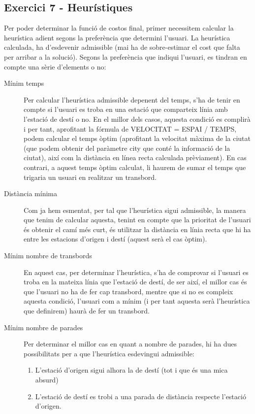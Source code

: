 \documentclass[a4paper,12pt]{article}
\begin{document}
        \subsection*{Exercici 7 - Heurístiques}

            Per poder determinar la funció de costos final, primer necessitem calcular la heurística adient segons la preferència que determini l’usuari.
            La heurística calculada, ha d’esdevenir admissible (mai ha de sobre-estimar el cost que falta per arribar a la solució).
            Segons la preferència que indiqui l’usuari, es tindran en compte una sèrie d’elements o no:
            \begin{description}
                \item[Mínim temps] Per calcular l’heurística admissible depenent del temps, s’ha de tenir en compte si l’usuari es troba en una estació que comparteix línia amb l’estació de destí o no. En el millor dels casos, aquesta condició es complirà i per tant, aprofitant la fórmula de VELOCITAT = ESPAI / TEMPS, podem calcular el temps òptim (aprofitant la velocitat màxima de la ciutat (que podem obtenir del paràmetre city que conté la informació de la ciutat), així com la distància en línea recta calculada prèviament).
                En cas contrari, a aquest temps òptim calculat, li haurem de sumar el temps que trigaria un usuari en realitzar un transbord.
                \item[Distància mínima] Com ja hem esmentat, per tal que l’heurística sigui admissible, la manera que tenim de calcular aquesta, tenint en compte que la prioritat de l’usuari és obtenir el camí més curt, és utilitzar la distància en línia recta que hi ha entre les estacions d’origen i destí (aquest serà el cas òptim).
                \item[Mínim nombre de transbords] En aquest cas, per determinar l’heurística, s’ha de comprovar si l’usuari es troba en la mateixa línia que l’estació de destí, de ser així, el millor cas és que l’usuari no ha de fer cap transbord, mentre que si no es compleix aquesta condició, l’usuari com a mínim (i per tant aquesta serà l’heurística que definirem) haurà de fer un transbord.
                \item[Mínim nombre de parades] Per determinar el millor cas en quant a nombre de parades, hi ha dues possibilitats per a que l’heurística esdevingui admissible:
                \begin{enumerate}
                    \item L’estació d’origen sigui alhora la de destí (tot i que és una mica absurd)
                    \item L’estació de destí es trobi a una parada de distància respecte l’estació d’origen.

                \end{enumerate} 
            \end{description}
                
\end{document}
